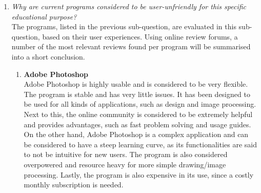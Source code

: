 \documentclass[a4paper,12pt]{article}
\begin{document}
\begin{enumerate}
\begin{enumerate}
    \underline{Pros:}\\
    \LaTeX is highly flexible and can be used for simple notes, but also for complex reports and documents. It is capable of displaying mathematical signs and formulas and has great community support. A user can choose a text editor best suited to the needs and wishes of the user.\\
    
    \underline{Cons:}\\
    The learning curve can be especially hard for users with little affinity to coding or markdown languages. Also, if the user encounters an unknown sign, looking for the right keyword can be a lengthy process, which is undesirable for example during classes. Also, free drawing is not supported, which can be difficult in certain educational situations.\\
    
  \end{enumerate}
  
\item \textit{Why are current programs considered to be user-unfriendly for this specific educational purpose?}\\
  The programs, listed in the previous sub-question, are evaluated in this sub-question, based on their user experiences. Using online review forums, a number of the most relevant reviews found per program will be summarised into a short conclusion.
  
  \begin{enumerate}
  \item \textbf{Adobe Photoshop}\\
    Adobe Photoshop is highly usable and is considered to be very flexible. The program is stable and has very little issues. It has been designed to be used for all kinds of applications, such as design and image processing.
    Next to this, the online community is considered to be extremely helpful and provides advantages, such as fast problem solving and usage guides.\\

    On the other hand, Adobe Photoshop is a complex application and can be considered to have a steep learning curve, as its functionalities are said to not be intuitive for new users. The program is also considered overpowered and resource heavy for more simple drawing/image processing. Lastly, the program is also expensive in its use, since a costly monthly subscription is needed.\\


\end{enumerate}
\end{enumerate}
\end{document}
